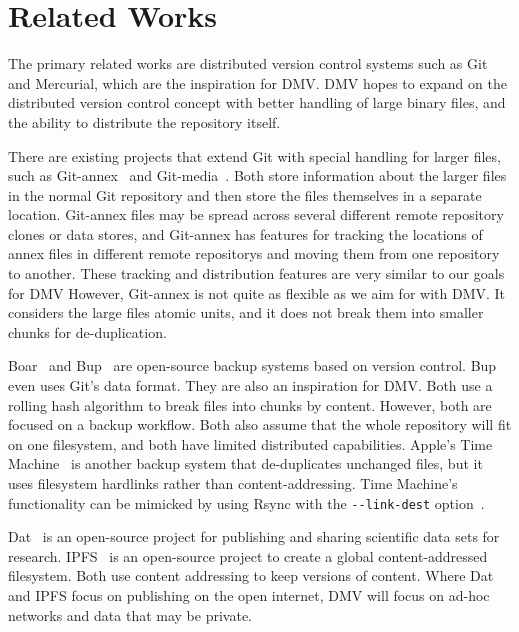 \section{Related Works}

The primary related works are distributed version control systems such as Git and Mercurial, which are the inspiration for DMV.
DMV hopes to expand on the distributed version control concept with better handling of large binary files, and the ability to distribute the repository itself.

There are existing projects that extend Git with special handling for larger files, such as Git-annex~\cite{git_annex_homepage} and Git-media~\cite{git_media_github}.
Both store information about the larger files in the normal Git \gls{repository} and then store the files themselves in a separate location.
Git-annex files may be spread across several different remote \gls{repository} clones or data stores, and Git-annex has features for tracking the locations of annex files in different remote \glspl{repository} and moving them from one \gls{repository} to another.
These tracking and distribution features are very similar to our goals for DMV
However, Git-annex is not quite as flexible as we aim for with \gls{DMV}.
It considers the large files atomic units, and it does not break them into smaller chunks for de-duplication.

Boar~\cite{boar_homepage} and Bup~\cite{bup_homepage} are open-source backup systems based on version control.
Bup even uses Git's data format.
They are also an inspiration for DMV.
Both use a rolling hash algorithm to break files into chunks by content.
However, both are focused on a backup workflow.
Both also assume that the whole repository will fit on one filesystem, and both have limited distributed capabilities.
Apple's Time Machine~\cite{timemachine_patent} is another backup system that de-duplicates unchanged files, but it uses filesystem hardlinks rather than content-addressing.
Time Machine's functionality can be mimicked by using Rsync with the \lstinline{--link-dest} option~\cite{timemachine_foreveryunix}.

Dat~\cite{dat_homepage} is an open-source project for publishing and sharing scientific data sets for research.
IPFS~\cite{ipfs_github_main} is an open-source pro\-ject to create a global content-addressed filesystem.
Both use content addressing to keep versions of content.
Where Dat and IPFS focus on publishing on the open internet, DMV will focus on ad-hoc networks and data that may be private.

